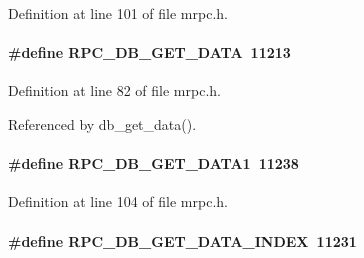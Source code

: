 \begin{DoxyItemize}
\item 
\end{DoxyItemize}

Definition at line 101 of file mrpc.h.
\paragraph[{RPC\_\-DB\_\-GET\_\-DATA}]{\setlength{\rightskip}{0pt plus 5cm}\#define RPC\_\-DB\_\-GET\_\-DATA~11213}\hfill\label{group__mrpcdefineh_ga730e088a2e3838d04d5f4aa55466f2e3}

\begin{DoxyItemize}
\item 
\end{DoxyItemize}

Definition at line 82 of file mrpc.h.

Referenced by db\_\-get\_\-data().
\paragraph[{RPC\_\-DB\_\-GET\_\-DATA1}]{\setlength{\rightskip}{0pt plus 5cm}\#define RPC\_\-DB\_\-GET\_\-DATA1~11238}\hfill\label{group__mrpcdefineh_ga62aeeff0128db0be59b11c0b7c731414}

\begin{DoxyItemize}
\item 
\end{DoxyItemize}

Definition at line 104 of file mrpc.h.
\paragraph[{RPC\_\-DB\_\-GET\_\-DATA\_\-INDEX}]{\setlength{\rightskip}{0pt plus 5cm}\#define RPC\_\-DB\_\-GET\_\-DATA\_\-INDEX~11231}\hfill\label{group__mrpcdefineh_gab80c89111861b0429b50a67a90fc7ec8}

\begin{DoxyItemize}
\item 
\end{DoxyItemize}

